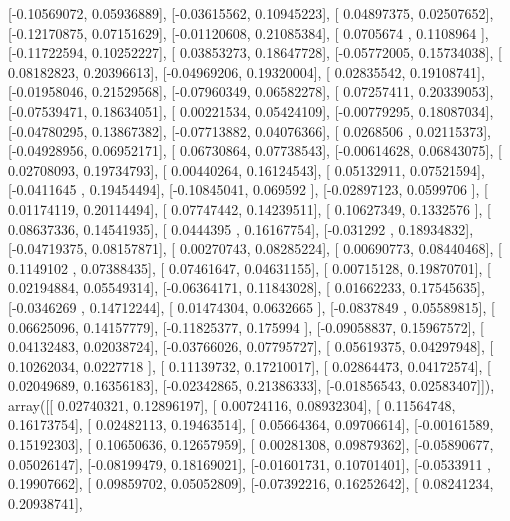 \documentclass{article}
\begin{document}
       [-0.10569072,  0.05936889],
       [-0.03615562,  0.10945223],
       [ 0.04897375,  0.02507652],
       [-0.12170875,  0.07151629],
       [-0.01120608,  0.21085384],
       [ 0.0705674 ,  0.1108964 ],
       [-0.11722594,  0.10252227],
       [ 0.03853273,  0.18647728],
       [-0.05772005,  0.15734038],
       [ 0.08182823,  0.20396613],
       [-0.04969206,  0.19320004],
       [ 0.02835542,  0.19108741],
       [-0.01958046,  0.21529568],
       [-0.07960349,  0.06582278],
       [ 0.07257411,  0.20339053],
       [-0.07539471,  0.18634051],
       [ 0.00221534,  0.05424109],
       [-0.00779295,  0.18087034],
       [-0.04780295,  0.13867382],
       [-0.07713882,  0.04076366],
       [ 0.0268506 ,  0.02115373],
       [-0.04928956,  0.06952171],
       [ 0.06730864,  0.07738543],
       [-0.00614628,  0.06843075],
       [ 0.02708093,  0.19734793],
       [ 0.00440264,  0.16124543],
       [ 0.05132911,  0.07521594],
       [-0.0411645 ,  0.19454494],
       [-0.10845041,  0.069592  ],
       [-0.02897123,  0.0599706 ],
       [ 0.01174119,  0.20114494],
       [ 0.07747442,  0.14239511],
       [ 0.10627349,  0.1332576 ],
       [ 0.08637336,  0.14541935],
       [ 0.0444395 ,  0.16167754],
       [-0.031292  ,  0.18934832],
       [-0.04719375,  0.08157871],
       [ 0.00270743,  0.08285224],
       [ 0.00690773,  0.08440468],
       [ 0.1149102 ,  0.07388435],
       [ 0.07461647,  0.04631155],
       [ 0.00715128,  0.19870701],
       [ 0.02194884,  0.05549314],
       [-0.06364171,  0.11843028],
       [ 0.01662233,  0.17545635],
       [-0.0346269 ,  0.14712244],
       [ 0.01474304,  0.0632665 ],
       [-0.0837849 ,  0.05589815],
       [ 0.06625096,  0.14157779],
       [-0.11825377,  0.175994  ],
       [-0.09058837,  0.15967572],
       [ 0.04132483,  0.02038724],
       [-0.03766026,  0.07795727],
       [ 0.05619375,  0.04297948],
       [ 0.10262034,  0.0227718 ],
       [ 0.11139732,  0.17210017],
       [ 0.02864473,  0.04172574],
       [ 0.02049689,  0.16356183],
       [-0.02342865,  0.21386333],
       [-0.01856543,  0.02583407]]), array([[ 0.02740321,  0.12896197],
       [ 0.00724116,  0.08932304],
       [ 0.11564748,  0.16173754],
       [ 0.02482113,  0.19463514],
       [ 0.05664364,  0.09706614],
       [-0.00161589,  0.15192303],
       [ 0.10650636,  0.12657959],
       [ 0.00281308,  0.09879362],
       [-0.05890677,  0.05026147],
       [-0.08199479,  0.18169021],
       [-0.01601731,  0.10701401],
       [-0.0533911 ,  0.19907662],
       [ 0.09859702,  0.05052809],
       [-0.07392216,  0.16252642],
       [ 0.08241234,  0.20938741],
\end{document}
